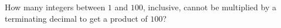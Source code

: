 How many integers between $1$ and $100$, inclusive, cannot be multiplied by a terminating decimal to get a product of $100$?
